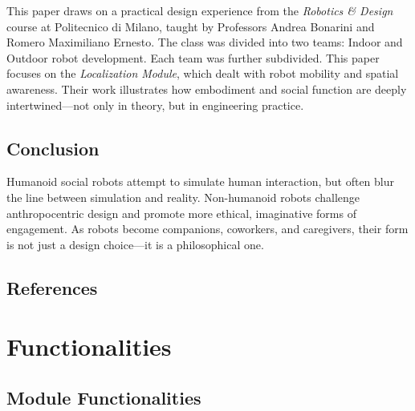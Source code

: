 \documentclass{article}
\begin{document}
This paper draws on a practical design experience from the \textit{Robotics \& Design} course at Politecnico di Milano, taught by Professors Andrea Bonarini and Romero Maximiliano Ernesto. The class was divided into two teams: Indoor and Outdoor robot development. Each team was further subdivided. This paper focuses on the \textit{Localization Module}, which dealt with robot mobility and spatial awareness.
Their work illustrates how embodiment and social function are deeply intertwined—not only in theory, but in engineering practice.

\subsection{Conclusion}

Humanoid social robots attempt to simulate human interaction, but often blur the line between simulation and reality. Non-humanoid robots challenge anthropocentric design and promote more ethical, imaginative forms of engagement. As robots become companions, coworkers, and caregivers, their form is not just a design choice—it is a philosophical one.

\subsection*{References}



\newpage
\section{Functionalities}
\subsection{Module Functionalities}
\end{document}
